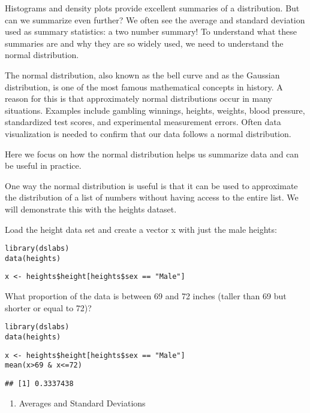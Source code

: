 \documentclass[]{article}
\providecommand{\tightlist}{%
  \setlength{\itemsep}{0pt}\setlength{\parskip}{0pt}}
\begin{document}
Histograms and density plots provide excellent summaries of a
distribution. But can we summarize even further? We often see the
average and standard deviation used as summary statistics: a two number
summary! To understand what these summaries are and why they are so
widely used, we need to understand the normal distribution.

The normal distribution, also known as the bell curve and as the
Gaussian distribution, is one of the most famous mathematical concepts
in history. A reason for this is that approximately normal distributions
occur in many situations. Examples include gambling winnings, heights,
weights, blood pressure, standardized test scores, and experimental
measurement errors. Often data visualization is needed to confirm that
our data follows a normal distribution.

Here we focus on how the normal distribution helps us summarize data and
can be useful in practice.

One way the normal distribution is useful is that it can be used to
approximate the distribution of a list of numbers without having access
to the entire list. We will demonstrate this with the heights dataset.

Load the height data set and create a vector x with just the male
heights:

\begin{verbatim}
library(dslabs)  
data(heights)  
\end{verbatim}

\begin{verbatim}
x <- heights$height[heights$sex == "Male"]  
\end{verbatim}

What proportion of the data is between 69 and 72 inches (taller than 69
but shorter or equal to 72)?

\begin{verbatim}
library(dslabs)
data(heights)
\end{verbatim}

\begin{verbatim}
x <- heights$height[heights$sex == "Male"]
mean(x>69 & x<=72)
\end{verbatim}

\begin{verbatim}
## [1] 0.3337438
\end{verbatim}

\begin{enumerate}
\def\labelenumi{\arabic{enumi}.}
\setcounter{enumi}{1}
\tightlist
\item
  Averages and Standard Deviations
\end{enumerate}
\end{document}

